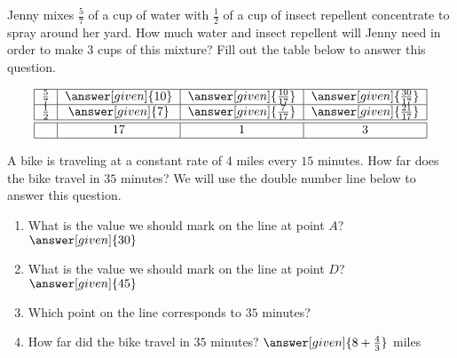 \documentclass[nooutcomes]{ximera}
\begin{document}
\begin{problem}
Jenny mixes $\frac{5}{7}$ of a cup of water with $\frac{1}{2}$ of a cup of insect repellent concentrate to spray around her yard.  How much water and insect repellent will Jenny need in order to make $3$ cups of this mixture?  Fill out the table below to answer this question.

\[
\begin{tabular}{|c|c|c|c|} \hline
$\frac{5}{7}$ & $\answer[given]{10}$ & $\answer[given]{\frac{10}{17}}$ & $\answer[given]{\frac{30}{17}}$ \\ \hline
$\frac{1}{2}$ & $\answer[given]{7}$ & $\answer[given]{\frac{7}{17}}$ & $\answer[given]{\frac{21}{17}}$ \\ \hline \hline
  & 17 & 1 & 3 \\ \hline
\end{tabular}
\]

\end{problem}




\begin{problem}
A bike is traveling at a constant rate of $4$ miles every $15$ minutes.  How far does the bike travel in $35$ minutes?  We will use the double number line below to answer this question.

\begin{center}
\end{center}
\begin{enumerate}
	\item What is the value we should mark on the line at point $A$? $\answer[given]{30}$
	\item What is the value we should mark on the line at point $D$? $\answer[given]{45}$
	\item Which point on the line corresponds to $35$ minutes?
		 \begin{multipleChoice}
		 \end{multipleChoice}
	\item How far did the bike travel in $35$ minutes? $\answer[given]{8+\frac{4}{3}}$ miles
\end{enumerate}

\end{problem}
\end{document}

